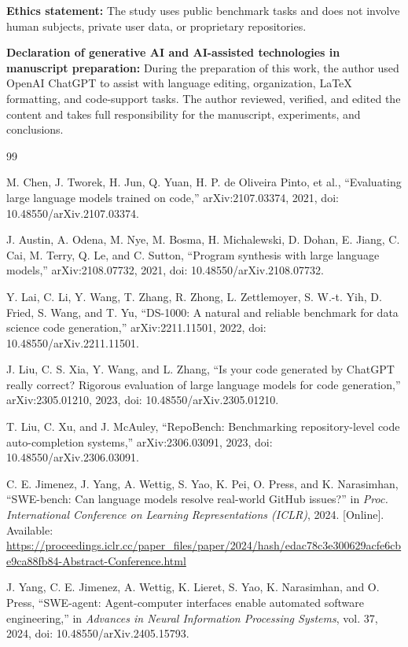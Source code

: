\documentclass[preprint,12pt]{elsarticle}
\begin{document}
\noindent\textbf{Ethics statement:} The study uses public benchmark tasks and does not involve human subjects, private user data, or proprietary repositories.

\noindent\textbf{Declaration of generative AI and AI-assisted technologies in manuscript preparation:} During the preparation of this work, the author used OpenAI ChatGPT to assist with language editing, organization, LaTeX formatting, and code-support tasks. The author reviewed, verified, and edited the content and takes full responsibility for the manuscript, experiments, and conclusions.

\begin{thebibliography}{99}

 M. Chen, J. Tworek, H. Jun, Q. Yuan, H. P. de Oliveira Pinto, et al., ``Evaluating large language models trained on code,'' arXiv:2107.03374, 2021, doi: 10.48550/arXiv.2107.03374.

 J. Austin, A. Odena, M. Nye, M. Bosma, H. Michalewski, D. Dohan, E. Jiang, C. Cai, M. Terry, Q. Le, and C. Sutton, ``Program synthesis with large language models,'' arXiv:2108.07732, 2021, doi: 10.48550/arXiv.2108.07732.

 Y. Lai, C. Li, Y. Wang, T. Zhang, R. Zhong, L. Zettlemoyer, S. W.-t. Yih, D. Fried, S. Wang, and T. Yu, ``DS-1000: A natural and reliable benchmark for data science code generation,'' arXiv:2211.11501, 2022, doi: 10.48550/arXiv.2211.11501.

 J. Liu, C. S. Xia, Y. Wang, and L. Zhang, ``Is your code generated by ChatGPT really correct? Rigorous evaluation of large language models for code generation,'' arXiv:2305.01210, 2023, doi: 10.48550/arXiv.2305.01210.

 T. Liu, C. Xu, and J. McAuley, ``RepoBench: Benchmarking repository-level code auto-completion systems,'' arXiv:2306.03091, 2023, doi: 10.48550/arXiv.2306.03091.

 C. E. Jimenez, J. Yang, A. Wettig, S. Yao, K. Pei, O. Press, and K. Narasimhan, ``SWE-bench: Can language models resolve real-world GitHub issues?'' in \textit{Proc. International Conference on Learning Representations (ICLR)}, 2024. [Online]. Available: \url{https://proceedings.iclr.cc/paper_files/paper/2024/hash/edac78c3e300629acfe6cbe9ca88fb84-Abstract-Conference.html}

 J. Yang, C. E. Jimenez, A. Wettig, K. Lieret, S. Yao, K. Narasimhan, and O. Press, ``SWE-agent: Agent-computer interfaces enable automated software engineering,'' in \textit{Advances in Neural Information Processing Systems}, vol. 37, 2024, doi: 10.48550/arXiv.2405.15793.


\end{thebibliography}
\end{document}
